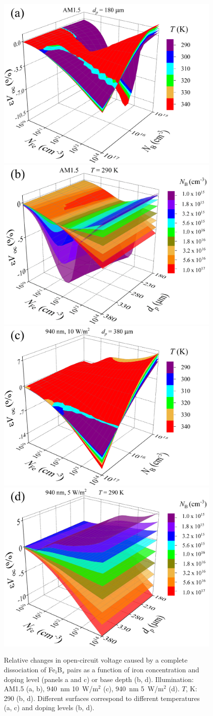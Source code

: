 \documentclass[a4paper,fleqn]{cas-sc}
\begin{document}
\begin{figure}
	\centering
     \includegraphics[width=0.49\linewidth]{Fig6a.png}
     \includegraphics[width=0.49\linewidth]{Fig6b.png}
     \includegraphics[width=0.49\linewidth]{Fig6c.png}
     \includegraphics[width=0.49\linewidth]{Fig6d.png}
	  \caption{Relative changes in open-circuit voltage caused by a complete
       dissociation of Fe$_i$B$_s$ pairs as a function of
       iron concentration and
       doping level (panels a and c) or base depth (b, d).
       Illumination: AM1.5 (a, b), 940~nm 10~W/m$^{2}$ (c),  940~nm 5~W/m$^{2}$ (d).
       $T$, K: 290 (b, d).
       Different surfaces correspond to different temperatures (a, c) and doping levels (b, d).
}\label{fig6}
\end{figure}
\end{document}
